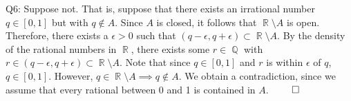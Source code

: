 \documentclass[letterpaper]{article}
\DeclareMathOperator{\R}{\mathbb{R}}
\DeclareMathOperator{\Q}{\mathbb{Q}}
\begin{document}
Q6: Suppose not. That is, suppose that there exists an irrational number $q\in[0,1]$ but with $q \notin A$. Since $A$ is closed, it follows that
$\R \setminus A $ is open. Therefore, there exists a $\epsilon > 0$ such that $(q-\epsilon, q+ \epsilon) \subset \R\setminus A$. By the density of the rational numbers in $\R$, there exists some $r\in \Q$ with $r \in (q-\epsilon, q+\epsilon) \subset \R \setminus A$. Note that since $q\in [0,1]$ and $r$ is within $\epsilon$ of $q$, $q\in[0,1]$. However, $q\in \R \setminus A \implies q \notin A$. We obtain a contradiction, since we assume that every rational between 0 and 1 is contained in $A$. $\qed$
\end{document}
